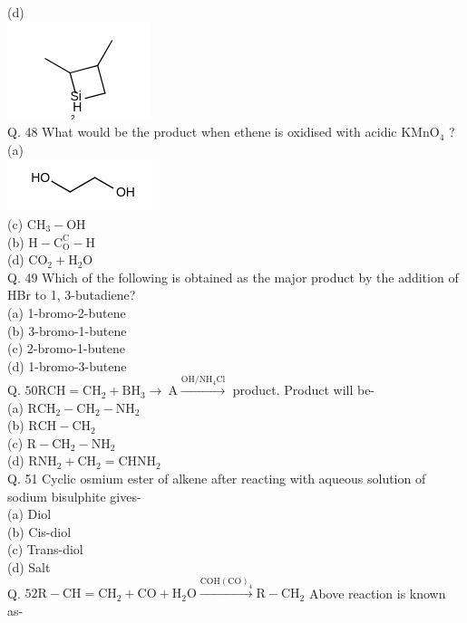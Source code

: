 \documentclass[10pt]{article}
\begin{document}
(d)\\
\includegraphics{smile-578354ce5fbb4a8da4246cb1a8c6cc025ebcb087}\\
Q. 48 What would be the product when ethene is oxidised with acidic $\mathrm{KMnO}_{4}$ ?\\
(a)\\
\includegraphics{smile-72e8c3364ebc1428afdbf0a97ce51d0db78bea82}\\
(c) $\mathrm{CH}_{3}-\mathrm{OH}$\\
(b) $\mathrm{H}-\mathrm{C}_{\mathrm{O}}^{\mathrm{C}}-\mathrm{H}$\\
(d) $\mathrm{CO}_{2}+\mathrm{H}_{2} \mathrm{O}$\\
Q. 49 Which of the following is obtained as the major product by the addition of HBr to 1, 3-butadiene?\\
(a) 1-bromo-2-butene\\
(b) 3-bromo-1-butene\\
(c) 2-bromo-1-butene\\
(d) 1-bromo-3-butene\\
Q. $50 \mathrm{RCH}=\mathrm{CH}_{2}+\mathrm{BH}_{3} \rightarrow \mathrm{~A} \xrightarrow{\mathrm{OH} / \mathrm{NH}_{4} \mathrm{Cl}}$ product. Product will be-\\
(a) $\mathrm{RCH}_{2}-\mathrm{CH}_{2}-\mathrm{NH}_{2}$\\
(b) $\mathrm{RCH}-\mathrm{CH}_{2}$\\
(c) $\mathrm{R}-\mathrm{CH}_{2}-\mathrm{NH}_{2}$\\
(d) $\mathrm{RNH}_{2}+\mathrm{CH}_{2}=\mathrm{CHNH}_{2}$\\
Q. 51 Cyclic osmium ester of alkene after reacting with aqueous solution of sodium bisulphite gives-\\
(a) Diol\\
(b) Cis-diol\\
(c) Trans-diol\\
(d) Salt\\
Q. $52 \mathrm{R}-\mathrm{CH}=\mathrm{CH}_{2}+\mathrm{CO}+\mathrm{H}_{2} \mathrm{O} \xrightarrow{\mathrm{COH}(\mathrm{CO})_{4}} \mathrm{R}-\mathrm{CH}_{2}$ Above reaction is known as-\\
\end{document}
